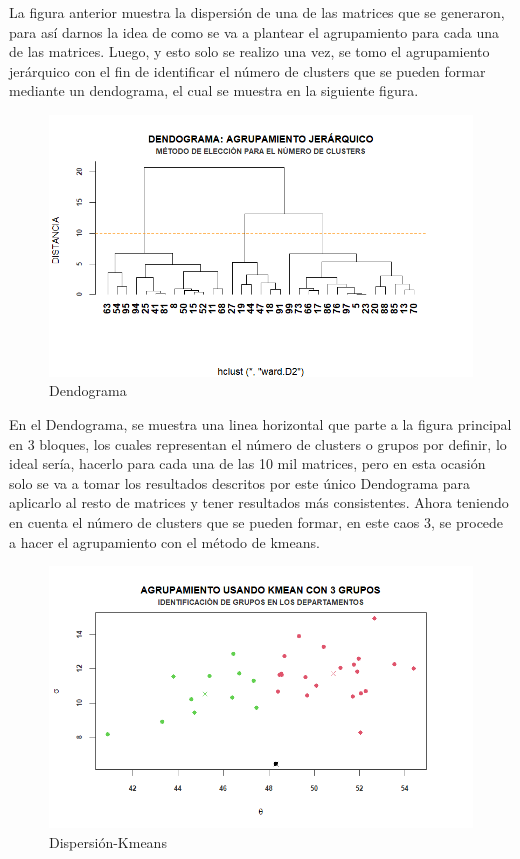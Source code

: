 \documentclass[12pt]{article}
\begin{document}
La figura anterior muestra la dispersión de una de las matrices que se generaron, para así darnos la idea de como se va a plantear el agrupamiento para cada una de las matrices. Luego, y esto solo se realizo una vez, se tomo el agrupamiento jerárquico con el fin de identificar el número de clusters que se pueden formar mediante un dendograma, el cual se muestra en la siguiente figura.

\begin{figure}[H]
    \centering
    \includegraphics[width=0.7\linewidth]{Imagenes/Dendograma.png}
    \caption{Dendograma}
    \label{fig_enter_label}
\end{figure}

En el Dendograma, se muestra una linea horizontal que parte  a la figura principal en 3 bloques, los cuales representan el número de clusters o grupos por definir, lo ideal sería, hacerlo para cada una de las 10 mil matrices, pero en esta ocasión solo se va a tomar los resultados descritos por este único Dendograma para aplicarlo al resto de matrices y tener resultados más consistentes. Ahora teniendo en cuenta el número de clusters que se pueden formar, en este caos 3, se procede a hacer el agrupamiento con el método de kmeans.

\begin{figure}[H]
    \centering
    \includegraphics[width=0.7\linewidth]{Imagenes/Dispercion-Kmeans.png}
    \caption{Dispersión-Kmeans}
    \label{fig_enter_label}
\end{figure}
\end{document}
